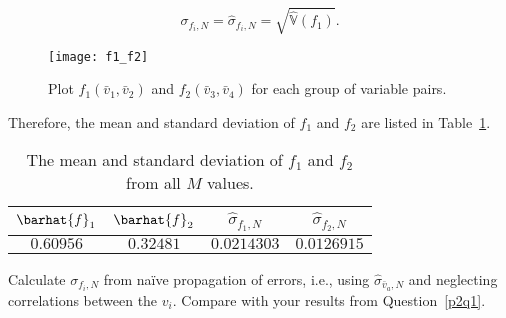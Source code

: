 \begin{equation}
    \sigma_{f_i,N} = \hat{\sigma}_{f_i,N} = \sqrt{\hat{\mathbb{V}}(f_1)}.
\end{equation}

\begin{figure}
    \centering
    \texttt{[image: f1\_f2]}
    \caption{Plot \(f_1(\bar{v}_1, \bar{v}_2)\) and \(f_2(\bar{v}_3, \bar{v}_4)\) for each group of variable pairs.}
    \label{fig:fi}
\end{figure}

Therefore, the mean and standard deviation of \(f_1\) and
\(f_2\) are listed in Table~\ref{tab:stdf1f2}.

\begin{table}
    \centering
    \caption{The mean and standard deviation of \(f_1\) and \(f_2\) from all \(M\) values.}
    \label{tab:stdf1f2}
    \begin{tabular}{@{}cccc@{}}
        \toprule
        \(\barhat{f}_1\) & \(\barhat{f}_2\) & \(\hat{\sigma}_{f_1,N}\) & \(\hat{\sigma}_{f_2,N}\) \\
        \midrule
        \(0.60956\)      & \(0.32481\)      & \(0.0214303\)            & \(0.0126915\)            \\
        \bottomrule
    \end{tabular}
\end{table}


\Question{} Calculate \(\sigma_{f_i,N}\) from naïve propagation of errors, i.e., using
\(\hat{\sigma}_{\bar{v}_a,N}\) and neglecting correlations between the \(v_i\). Compare with
your results from Question~\ref{p2q1}.

